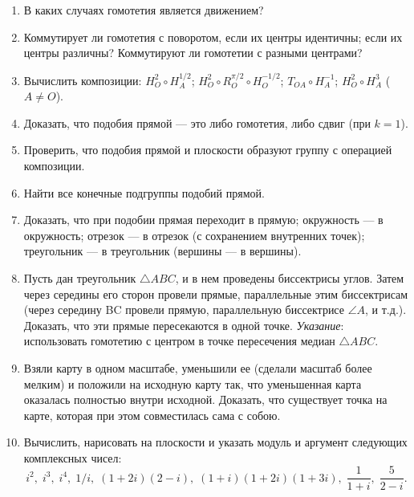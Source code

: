 \begin{enumerate}
\item В каких случаях гомотетия является движением?
\item Коммутирует ли гомотетия с поворотом, \ipunkt если их центры идентичны; \ipunkt если их центры различны? Коммутируют ли гомотетии с разными центрами?
\item Вычислить композиции: \ipunkt $H_O^2\circ H_A^{1/2}$; \ipunkt $H_O^2\circ R_O^{\pi/2}\circ H_O^{-1/2}$; $T_{OA}\circ H_A^{-1}$; \ipunkt $H_O^{2}\circ H_A^3$ ($A\ne O$).
\item Доказать, что подобия прямой --- это либо гомотетия, либо сдвиг (при $k=1$).
\item Проверить, что подобия прямой и плоскости образуют группу с операцией композиции.
\item Найти все конечные подгруппы подобий прямой.
\item Доказать, что при подобии \ipunkt прямая переходит в прямую; \ipunkt окружность --- в окружность; \ipunkt отрезок --- в отрезок (с сохранением внутренних точек); \ipunkt треугольник --- в треугольник (вершины --- в вершины).
\item Пусть дан треугольник $\triangle ABC$, и в нем проведены биссектрисы углов. Затем через середины его сторон провели прямые, параллельные этим биссектрисам (через середину BC провели прямую, параллельную биссектрисе $\angle A$, и т.д.). Доказать, что эти прямые пересекаются в одной точке.
\textit{Указание}: использовать гомотетию с центром в точке пересечения медиан $\triangle ABC$.
\item Взяли карту в одном масштабе, уменьшили ее (сделали масштаб более мелким) и положили на исходную карту так, что уменьшенная карта оказалась полностью внутри исходной. Доказать, что существует точка на карте, которая при этом совместилась сама с собою.
\item Вычислить, нарисовать на плоскости и указать модуль и аргумент следующих комплексных чисел:
$$
i^2,\;i^3,\;i^4,\;1/i,\;(1+2i)(2-i),\;(1+i)(1+2i)(1+3i),\;\frac{1}{1+i},\;\frac{5}{2-i}.
$$
\end{enumerate}




\setcounter{chapter}{34}

